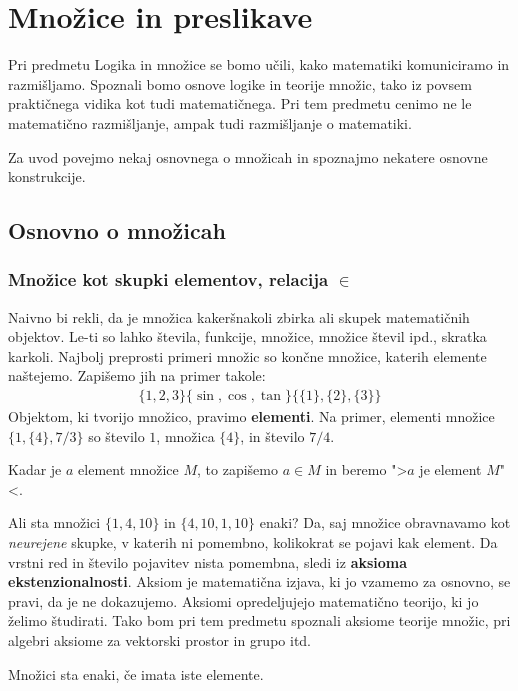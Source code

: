 \chapter{Množice in preslikave}

Pri predmetu Logika in množice se bomo učili, kako matematiki komuniciramo in razmišljamo. Spoznali bomo osnove logike
in teorije množic, tako iz povsem praktičnega vidika kot tudi matematičnega. Pri tem predmetu cenimo ne le matematično
razmišljanje, ampak tudi razmišljanje o matematiki.

Za uvod povejmo nekaj osnovnega o množicah in spoznajmo nekatere osnovne konstrukcije.

\section{Osnovno o množicah}

\subsection{Množice kot skupki elementov, relacija $\in$}

Naivno bi rekli, da je množica kakeršnakoli zbirka ali skupek matematičnih objektov. Le-ti so lahko števila, funkcije,
množice, množice števil ipd., skratka karkoli.
%
Najbolj preprosti primeri množic so končne množice, katerih elemente naštejemo. Zapišemo jih na primer takole:
%
\begin{gather*}
  \{1, 2, 3\}
  \{\sin, \cos, \tan\}
  \{\{1\}, \{2\}, \{3\}\}
\end{gather*}
%
Objektom, ki tvorijo množico, pravimo \textbf{elementi}. Na primer, elementi množice $\{1, \{4\}, 7/3\}$ so število $1$, množica $\{4\}$, in število $7/4$.

Kadar je $a$ element množice $M$, to zapišemo $a \in M$ in beremo ">$a$ je element $M$"<.

Ali sta množici $\{1, 4, 10\}$ in $\{4, 10, 1, 10\}$ enaki? Da, saj množice obravnavamo kot \emph{neurejene} skupke, v katerih ni pomembno, kolikokrat se pojavi kak element. Da vrstni red in število pojavitev nista pomembna, sledi iz \textbf{aksioma
ekstenzionalnosti}. Aksiom je matematična izjava, ki jo vzamemo za osnovno, se pravi, da je ne dokazujemo. Aksiomi opredeljujejo matematično teorijo, ki jo želimo študirati. Tako bom pri tem predmetu spoznali aksiome teorije množic, pri algebri aksiome za vektorski prostor in grupo itd.

\begin{aksiom}
  Množici sta enaki, če imata iste elemente.
\end{aksiom}

